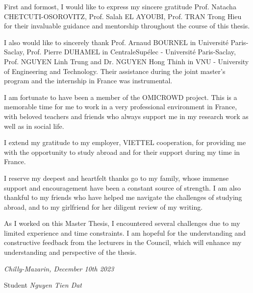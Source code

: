 First and formost, I would like to express my sincere gratitude
Prof. Natacha CHETCUTI-OSOROVITZ,
Prof. Salah EL AYOUBI,
Prof. TRAN Trong Hieu
for their invaluable guidance and mentorship throughout the course of this thesis.

I also would like to sincerely thank
Prof. Arnaud BOURNEL in Université Paris-Saclay,
Prof. Pierre DUHAMEL in CentraleSupélec - Université Paris-Saclay,
Prof. NGUYEN Linh Trung and Dr. NGUYEN Hong Thinh in VNU - University of Engineering and Technology.
Their assistance during the joint master’s program and the internship in France was instrumental.

I am fortunate to have been a member of the OMICROWD project.
This is a memorable time for me to work in a very professional environment in France, with beloved teachers and friends who always support me in my research work as well as in social life.

I extend my gratitude to my employer, VIETTEL cooperation, for providing me with the opportunity to study abroad and for their support during my time in France.

I reserve my deepest and heartfelt thanks go to my family,
whose immense support and encouragement have been a constant source of strength.
I am also thankful to my friends who have helped me navigate the challenges of studying abroad,
and to my girlfriend for her diligent review of my writing.

As I worked on this Master Thesis, I encountered several challenges due to my limited experience and time constraints. I am hopeful for the understanding and constructive feedback from the lecturers in the Council, which will enhance my understanding and perspective of the thesis.

\begin{flushright}
	\textit{Chilly-Mazarin, December 10th 2023}

	Student
	\vspace{4cm}
	\textit{Nguyen Tien Dat}
\end{flushright}